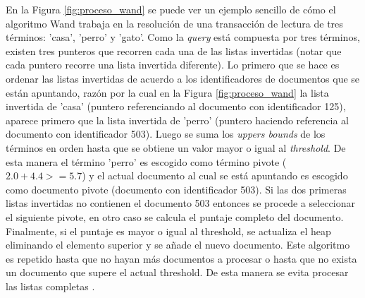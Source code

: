 En la Figura \ref{fig:proceso_wand} se puede ver un ejemplo sencillo de cómo el algoritmo Wand trabaja en la resolución de una transacción de lectura de tres términos: 'casa', 'perro' y 'gato'. Como la \textit{query} está compuesta por tres términos, existen tres punteros que recorren cada una de las listas invertidas (notar que cada puntero recorre una lista invertida diferente). Lo primero que se hace es ordenar las listas invertidas de acuerdo a los identificadores de documentos que se están apuntando, razón por la cual en la Figura \ref{fig:proceso_wand} la lista invertida de 'casa' (puntero referenciando al documento con identificador 125), aparece primero que la lista invertida de 'perro' (puntero haciendo referencia al documento con identificador 503). Luego se suma los \textit{uppers bounds} de los términos en orden hasta que se obtiene un valor mayor o igual al \textit{threshold}. De esta manera el término 'perro' es escogido como término pivote ($2.0 + 4.4 >= 5.7$) y el actual documento al cual se está apuntando es escogido como documento pivote (documento con identificador 503). Si las dos primeras listas invertidas no contienen el documento 503 entonces se procede a seleccionar el siguiente pivote, en otro caso se calcula el puntaje completo del documento. Finalmente, si el puntaje es mayor o igual al threshold, se actualiza el heap eliminando el elemento superior y se añade el nuevo documento. 
Este algoritmo es repetido hasta que no hayan más documentos a procesar o hasta que no exista un documento que supere el actual threshold. De esta manera se evita procesar las listas completas \citep{Blanco:2010}.

